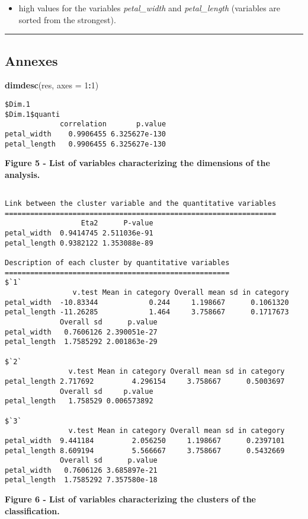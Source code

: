 \documentclass[]{article}
\newenvironment{Shaded}{\begin{snugshade}}{\end{snugshade}}
\newcommand{\KeywordTok}[1]{\textcolor[rgb]{0.13,0.29,0.53}{\textbf{#1}}}
\newcommand{\DataTypeTok}[1]{\textcolor[rgb]{0.13,0.29,0.53}{#1}}
\newcommand{\DecValTok}[1]{\textcolor[rgb]{0.00,0.00,0.81}{#1}}
\newcommand{\OperatorTok}[1]{\textcolor[rgb]{0.81,0.36,0.00}{\textbf{#1}}}
\newcommand{\NormalTok}[1]{#1}
\providecommand{\tightlist}{%
  \setlength{\itemsep}{0pt}\setlength{\parskip}{0pt}}
\begin{document}
\begin{itemize}
\tightlist
\item
  high values for the variables \emph{petal\_width} and
  \emph{petal\_length} (variables are sorted from the strongest).
\end{itemize}

\begin{center}\rule{0.5\linewidth}{\linethickness}\end{center}

\subsection{Annexes}\label{annexes}

\begin{Shaded}
\begin{Highlighting}[]
\KeywordTok{dimdesc}\NormalTok{(res, }\DataTypeTok{axes =} \DecValTok{1}\OperatorTok{:}\DecValTok{1}\NormalTok{)}
\end{Highlighting}
\end{Shaded}

\begin{verbatim}
$Dim.1
$Dim.1$quanti
             correlation       p.value
petal_width    0.9906455 6.325627e-130
petal_length   0.9906455 6.325627e-130
\end{verbatim}

\textbf{Figure 5 - List of variables characterizing the dimensions of
the analysis.}

\begin{Shaded}
\end{Shaded}

\begin{verbatim}

Link between the cluster variable and the quantitative variables
================================================================
                  Eta2      P-value
petal_width  0.9414745 2.511036e-91
petal_length 0.9382122 1.353088e-89

Description of each cluster by quantitative variables
=====================================================
$`1`
                v.test Mean in category Overall mean sd in category
petal_width  -10.83344            0.244     1.198667      0.1061320
petal_length -11.26285            1.464     3.758667      0.1717673
             Overall sd      p.value
petal_width   0.7606126 2.390051e-27
petal_length  1.7585292 2.001863e-29

$`2`
               v.test Mean in category Overall mean sd in category
petal_length 2.717692         4.296154     3.758667      0.5003697
             Overall sd     p.value
petal_length   1.758529 0.006573892

$`3`
               v.test Mean in category Overall mean sd in category
petal_width  9.441184         2.056250     1.198667      0.2397101
petal_length 8.609194         5.566667     3.758667      0.5432669
             Overall sd      p.value
petal_width   0.7606126 3.685897e-21
petal_length  1.7585292 7.357580e-18
\end{verbatim}

\textbf{Figure 6 - List of variables characterizing the clusters of the
classification.}
\end{document}
